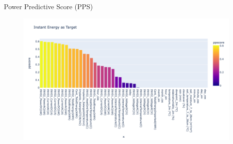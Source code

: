 \begin{frame}{Power Predictive Score (PPS)}
    \begin{figure}
        \centering
        \includegraphics[width=\textwidth]{sections/2_preprocessing/imgs/pptarget.png}
    \end{figure}
\end{frame}